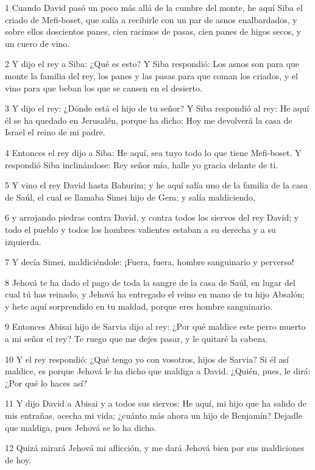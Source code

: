 \par 1 Cuando David pasó un poco más allá de la cumbre del monte, he aquí Siba el criado de Mefi-boset, que salía a recibirle con un par de asnos enalbardados, y sobre ellos doscientos panes, cien racimos de pasas, cien panes de higos secos, y un cuero de vino.
\par 2 Y dijo el rey a Siba: ¿Qué es esto? Y Siba respondió: Los asnos son para que monte la familia del rey, los panes y las pasas para que coman los criados, y el vino para que beban los que se cansen en el desierto.
\par 3 Y dijo el rey: ¿Dónde está el hijo de tu señor? Y Siba respondió al rey: He aquí él se ha quedado en Jerusalén, porque ha dicho: Hoy me devolverá la casa de Israel el reino de mi padre.
\par 4 Entonces el rey dijo a Siba: He aquí, sea tuyo todo lo que tiene Mefi-boset. Y respondió Siba inclinándose: Rey señor mío, halle yo gracia delante de ti.
\par 5 Y vino el rey David hasta Bahurim; y he aquí salía uno de la familia de la casa de Saúl, el cual se llamaba Simei hijo de Gera; y salía maldiciendo,
\par 6 y arrojando piedras contra David, y contra todos los siervos del rey David; y todo el pueblo y todos los hombres valientes estaban a su derecha y a su izquierda.
\par 7 Y decía Simei, maldiciéndole: ¡Fuera, fuera, hombre sanguinario y perverso!
\par 8 Jehová te ha dado el pago de toda la sangre de la casa de Saúl, en lugar del cual tú has reinado, y Jehová ha entregado el reino en mano de tu hijo Absalón; y hete aquí sorprendido en tu maldad, porque eres hombre sanguinario.
\par 9 Entonces Abisai hijo de Sarvia dijo al rey: ¿Por qué maldice este perro muerto a mi señor el rey? Te ruego que me dejes pasar, y le quitaré la cabeza.
\par 10 Y el rey respondió: ¿Qué tengo yo con vosotros, hijos de Sarvia? Si él así maldice, es porque Jehová le ha dicho que maldiga a David. ¿Quién, pues, le dirá: ¿Por qué lo haces así?
\par 11 Y dijo David a Abisai y a todos sus siervos: He aquí, mi hijo que ha salido de mis entrañas, acecha mi vida; ¿cuánto más ahora un hijo de Benjamín? Dejadle que maldiga, pues Jehová se lo ha dicho.
\par 12 Quizá mirará Jehová mi aflicción, y me dará Jehová bien por sus maldiciones de hoy.
